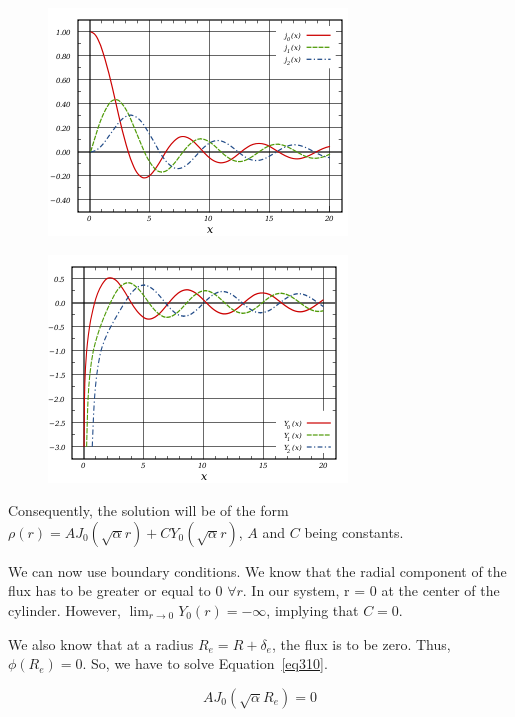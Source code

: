 \begin{figure}[t!]
	\centering
	\includegraphics[height=0.3\textheight]{fig/bessel_j.png}
	\label{fig31}
\end{figure}


\begin{figure}[t!]
	\centering
	\includegraphics[height=0.3\textheight]{fig/bessel_y.png}
	\label{fig32}
\end{figure}

Consequently, the solution will be of the form $\rho(r) = AJ_0(\sqrt{\alpha}r) + CY_0(\sqrt{\alpha}r)$, $A$ and $C$ being constants.

We can now use boundary conditions. We know that the radial component of the flux has to be greater or equal to 0 $\forall r$. In our system, r = 0 at the center of the cylinder. However, $\lim_{r\to 0} Y_0(r) = -\infty$, implying that $C = 0$.

We also know that at a radius $R_e = R + \delta_e$, the flux is to be zero. Thus, $\phi(R_e) = 0$. So, we have to solve Equation~\ref{eq310}.

\begin{equation}\label{eq310}
AJ_0(\sqrt{\alpha}R_e) = 0
\end{equation}


